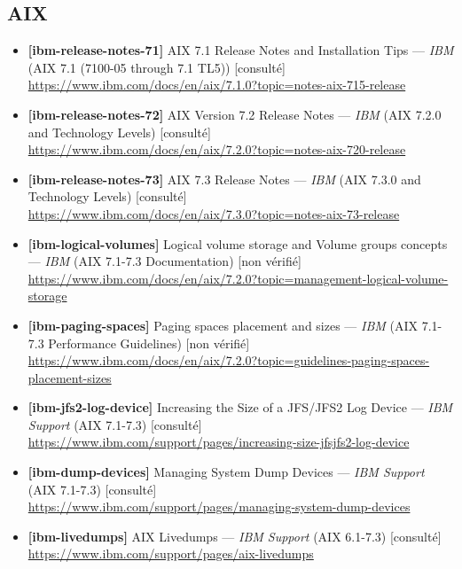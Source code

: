 \documentclass[10pt,a4paper]{article}
\begin{document}
\subsection{AIX}
\begin{itemize}[leftmargin=1.6em]
\item \textbf{[ibm-release-notes-71]} AIX 7.1 Release Notes and Installation Tips --- \textit{IBM} (AIX 7.1 (7100-05 through 7.1 TL5)) \textcolor{cOk}{[consult\'e]}\\ \url{https://www.ibm.com/docs/en/aix/7.1.0?topic=notes-aix-715-release}
\item \textbf{[ibm-release-notes-72]} AIX Version 7.2 Release Notes --- \textit{IBM} (AIX 7.2.0 and Technology Levels) \textcolor{cOk}{[consult\'e]}\\ \url{https://www.ibm.com/docs/en/aix/7.2.0?topic=notes-aix-720-release}
\item \textbf{[ibm-release-notes-73]} AIX 7.3 Release Notes --- \textit{IBM} (AIX 7.3.0 and Technology Levels) \textcolor{cOk}{[consult\'e]}\\ \url{https://www.ibm.com/docs/en/aix/7.3.0?topic=notes-aix-73-release}
\item \textbf{[ibm-logical-volumes]} Logical volume storage and Volume groups concepts --- \textit{IBM} (AIX 7.1-7.3 Documentation) \textcolor{cMed}{[non v\'erifi\'e]}\\ \url{https://www.ibm.com/docs/en/aix/7.2.0?topic=management-logical-volume-storage}
\item \textbf{[ibm-paging-spaces]} Paging spaces placement and sizes --- \textit{IBM} (AIX 7.1-7.3 Performance Guidelines) \textcolor{cMed}{[non v\'erifi\'e]}\\ \url{https://www.ibm.com/docs/en/aix/7.2.0?topic=guidelines-paging-spaces-placement-sizes}
\item \textbf{[ibm-jfs2-log-device]} Increasing the Size of a JFS/JFS2 Log Device --- \textit{IBM Support} (AIX 7.1-7.3) \textcolor{cOk}{[consult\'e]}\\ \url{https://www.ibm.com/support/pages/increasing-size-jfsjfs2-log-device}
\item \textbf{[ibm-dump-devices]} Managing System Dump Devices --- \textit{IBM Support} (AIX 7.1-7.3) \textcolor{cOk}{[consult\'e]}\\ \url{https://www.ibm.com/support/pages/managing-system-dump-devices}
\item \textbf{[ibm-livedumps]} AIX Livedumps --- \textit{IBM Support} (AIX 6.1-7.3) \textcolor{cOk}{[consult\'e]}\\ \url{https://www.ibm.com/support/pages/aix-livedumps}

\end{itemize}
\end{document}
